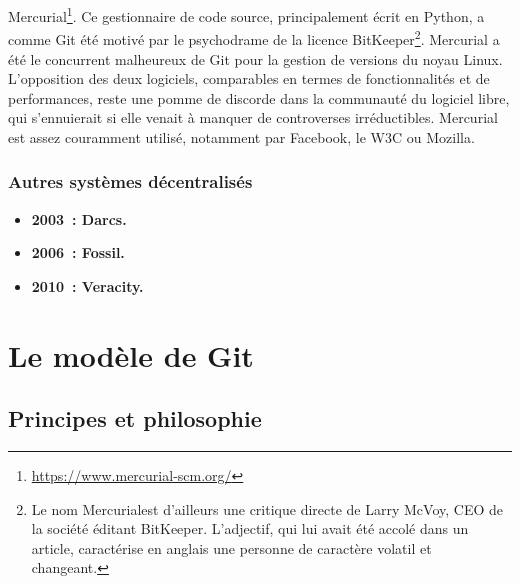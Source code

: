 \begin{itemize}
{    Mercurial\footnote{\url{https://www.mercurial-scm.org/}}.}
  Ce gestionnaire de code source, principalement écrit en Python, a
  comme Git été motivé par le psychodrame de la licence
  BitKeeper\footnote{Le nom \og Mercurial\fg est d'ailleurs une
    critique directe de Larry McVoy, CEO de la société éditant
    BitKeeper. L'adjectif, qui lui avait été accolé dans un article,
    caractérise en anglais une personne de caractère volatil et
    changeant.}. Mercurial a été le concurrent malheureux de Git pour
  la gestion de versions du noyau Linux. L'opposition des deux
  logiciels, comparables en termes de fonctionnalités et de
  performances, reste une pomme de discorde dans la communauté du
  logiciel libre, qui s'ennuierait si elle venait à manquer de
  controverses irréductibles. Mercurial est assez couramment utilisé,
  notamment par Facebook, le W3C ou Mozilla.
\end{itemize}

\subsubsection{Autres systèmes décentralisés}

\begin{itemize}
\item \textbf{2003~: Darcs.} %
\item \textbf{2006~: Fossil.} %
\item \textbf{2010~: Veracity.} %
\end{itemize}

\section{Le modèle de Git} %


\subsection{Principes et philosophie} %


